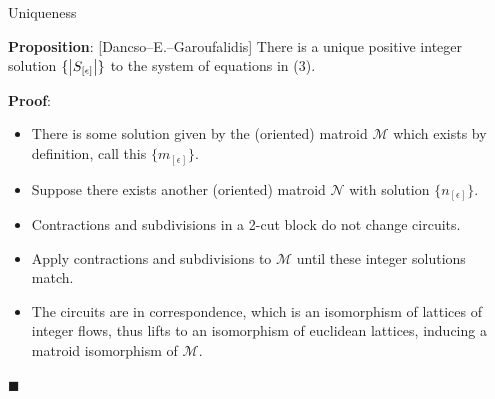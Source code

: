 \documentclass[9pt]{beamer}
\def\calM{\mathcal M}
\def\calN{\mathcal N}
\newcounter{definition}
\newcounter{proposition}
\newcommand{\proposition}[1]{\textbf{Proposition}: #1}
\renewcommand{\proof}[1]{\textbf{Proof}: #1}
\renewcommand{\qedsymbol}{$\blacksquare$}
\DeclarePairedDelimiter\abs{\lvert}{\rvert}
\begin{document}
    \begin{frame}{Uniqueness}

        \proposition{[Dancso--E.--Garoufalidis] There is a unique positive integer solution $\{\abs*{S_{[\epsilon]}}\}$ to the system of equations in (3).}

        \pause

        \vspace{12pt}

        \proof{\begin{itemize}
            \item There is some solution given by the (oriented) matroid $\calM$ which exists by definition, call this $\{m_{[\epsilon]}\}$.\pause
            \item Suppose there exists another (oriented) matroid $\calN$ with solution $\{n_{[\epsilon]}\}$.\pause
            \item Contractions and subdivisions in a 2-cut block do not change circuits.\pause
            \item Apply contractions and subdivisions to $\calM$ until these integer solutions match.\pause
            \item The circuits are in correspondence, which is an isomorphism of lattices of integer flows, thus lifts to an isomorphism of euclidean lattices, inducing a matroid isomorphism of $\calM$.
        \end{itemize}}

        \hspace*{\fill}\qedsymbol
        
    \end{frame}
\end{document}
